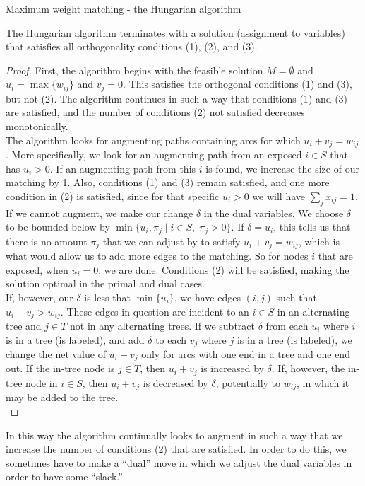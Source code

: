 \documentclass[11pt]{article}
\renewcommand{\'}{^{'}}
\newenvironment{theorem}[2][Theorem]{\begin{trivlist}
\item[\hskip \labelsep {\bfseries #1}\hskip \labelsep {\bfseries #2.}]}{\end{trivlist}}
\begin{document}
\begin{section}{Maximum weight matching - the Hungarian algorithm}
\begin{theorem}{}
	The Hungarian algorithm terminates with a solution (assignment to variables) that 
	satisfies all orthogonality conditions (1), (2), and (3).
\end{theorem}

\begin{proof}
	First, the algorithm begins with the feasible solution $M = \emptyset$ and 
	$u_i = \max \{w_{ij}\}$ and $v_j = 0$. This satisfies the orthogonal conditions 
	(1) and (3), but not (2). The algorithm continues in such a way that conditions 
	(1) and (3) are satisfied, and the number of conditions (2) not satisfied decreases 
	monotonically. \\
	The algorithm looks for augmenting paths containing arcs for which 
	$u_i + v_j = w_{ij}$. More specifically, we look for an augmenting path from an 
	exposed $i\in S$ that has $u_i > 0$. If an augmenting path from this $i$ is 
	found, we increase the size of our matching by 1. Also, conditions (1) and (3) 
	remain satisfied, and one more condition in (2) is satisfied, since for that 
	specific $u_i > 0$ we will have $\sum_{j} x_{ij} = 1$. \\
	If we cannot augment, we 
	make our change $\delta$ in the dual variables. We choose $\delta$ to be bounded 
	below by $\min \{u_i,\pi_j\; |\; i\in S,\; \pi_j > 0\}$. If $\delta = u_i$, this 
	tells us that there is no amount $\pi_j$ that we can adjust by to satisfy 
	$u_i + v_j = w_{ij}$, which is what would allow us to add more edges to the matching. 
	So for nodes $i$ that are exposed, when $u_i = 0$, we are done. Conditions (2) will 
	be satisfied, making the solution optimal in the primal and dual cases. \\
	If, however, our $\delta$ is less that $\min\{u_i\}$, we have edges $(i,j)$ 
	such that $u_i + v_j > w_{ij}$. These edges in question are incident to an 
	$i\in S$ in an alternating tree and $j\in T$ not in any alternating trees. 
	If we subtract $\delta$ 
	from each $u_i$ where $i$ is in a tree (is labeled), and add $\delta$ to each 
	$v_j$ where $j$ is in a tree (is labeled), we change the net value of $u_i + v_j$ 
	only for arcs with one end in a tree and one end out. If the in-tree node is 
	$j\in T$, then $u_i + v_j$ is increased by $\delta$. If, however, the in-tree node 
	in $i\in S$, then $u_i + v_j$ is decreased by $\delta$, potentially to $w_{ij}$, 
	in which it may be added to the tree.\\
\end{proof}
	In this way the algorithm continually looks to augment in such a way that we 
	increase the number of conditions (2) that are satisfied. In order to do this, we 
	sometimes have to make a ``dual'' move in which we adjust the dual variables in 
	order to have some ``slack.''

\end{section}
\end{document}
